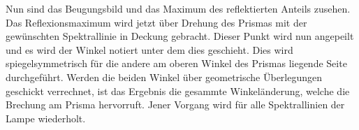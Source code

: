 Nun sind das Beugungsbild und das Maximum des reflektierten Anteils zusehen.
Das Reflexionsmaximum wird jetzt über Drehung des Prismas mit der gewünschten Spektrallinie in Deckung gebracht.
Dieser Punkt wird nun angepeilt und es wird der Winkel notiert unter dem dies geschieht.
Dies wird spiegelsymmetrisch für die andere am oberen Winkel des Prismas liegende Seite durchgeführt.
Werden die beiden Winkel über geometrische Überlegungen geschickt verrechnet, ist das Ergebnis die gesammte Winkeländerung, welche die Brechung am Prisma hervorruft.
Jener Vorgang wird für alle Spektrallinien der Lampe wiederholt.
